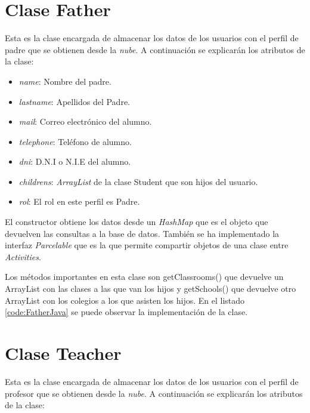 	\section{Clase Father}
	
		Esta es la clase encargada de almacenar los datos de los usuarios con el perfil de padre que se obtienen desde la {\it nube}.
		A continuación se explicarán los atributos de la clase:
		
		\begin{itemize}
			\item {\it name}: Nombre del padre.
			\item {\it lastname}: Apellidos del Padre.
			\item {\it mail}: Correo electrónico del alumno.
			\item {\it telephone}: Teléfono de alumno.
			\item {\it dni}: D.N.I o N.I.E del alumno.
			\item {\it childrens}: {\it ArrayList}\cite{12:arraytist:online} de la clase {\ttfamily Student} que son hijos del usuario.
			\item {\it rol}: El rol en este perfil es Padre.
		\end{itemize}
		
		El constructor obtiene los datos desde un {\it HashMap}\cite{10:hashmap:online} que es el objeto que devuelven las consultas a la base de datos. También se ha implementado la interfaz {\it Parcelable}\cite{11:parcelable:online} que es la que permite compartir objetos de una clase entre {\it Activities}. 
		
		\bigskip
		Los métodos importantes en esta clase son {\ttfamily getClassrooms()} que devuelve un ArrayList con las clases a las que van los hijos y {\ttfamily getSchools()} que devuelve otro ArrayList con los colegios a los que asisten los hijos.
		En el listado \ref{code:FatherJava} se puede observar la implementación de la clase.
		
		
	
	\section{Clase Teacher}
	
		Esta es la clase encargada de almacenar los datos de los usuarios con el perfil de profesor que se obtienen desde la {\it nube}.
		A continuación se explicarán los atributos de la clase:
		
